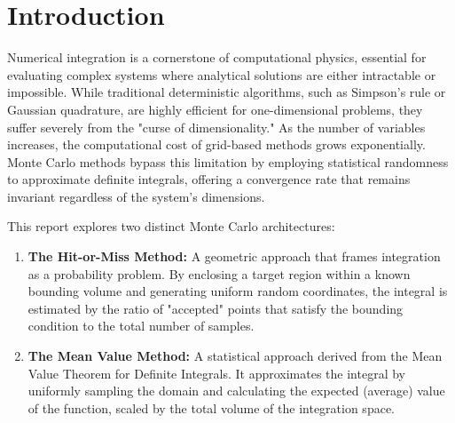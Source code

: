 \documentclass[12pt, a4paper, twoside]{article}
\begin{document}
    \begin{abstract}
        This report investigates the application and statistical validity of Monte Carlo computational methods for solving deterministic integration problems. By utilizing pseudorandom number generation, both the Hit-or-Miss (rejection) method and the Mean Value (sample average) method are implemented to evaluate integrals across single and multiple dimensions. The study spans fundamental geometric estimations, such as the computation of $\pi$, to complex multi-dimensional surface volumes bounded by non-linear constraints, including a paraboloid over a circular domain. A central focus is placed on the rigorous empirical verification of the algorithm's statistical error. Through logarithmic curve fitting of the absolute error against the number of iterations ($N$), the results successfully demonstrate that the integration error strictly adheres to the $O(N^{-0.5})$ convergence rate dictated by the Central Limit Theorem, completely independent of the integral's dimensionality.
    \end{abstract}
    
    \thispagestyle{empty}
    \newpage

  	\tableofcontents
	\thispagestyle{empty}
	
	\clearpage

    \section{Introduction}

       Numerical integration is a cornerstone of computational physics, essential for evaluating complex systems where analytical solutions are either intractable or impossible. While traditional deterministic algorithms, such as Simpson's rule or Gaussian quadrature, are highly efficient for one-dimensional problems, they suffer severely from the "curse of dimensionality." As the number of variables increases, the computational cost of grid-based methods grows exponentially. Monte Carlo methods bypass this limitation by employing statistical randomness to approximate definite integrals, offering a convergence rate that remains invariant regardless of the system's dimensions.
       
       This report explores two distinct Monte Carlo architectures:
       \begin{enumerate}
        \item {\bf The Hit-or-Miss Method:} A geometric approach that frames integration as a probability problem. By enclosing a target region within a known bounding volume and generating uniform random coordinates, the integral is estimated by the ratio of "accepted" points that satisfy the bounding condition to the total number of samples.
        \item  {\bf The Mean Value Method:} A statistical approach derived from the Mean Value Theorem for Definite Integrals. It approximates the integral by uniformly sampling the domain and calculating the expected (average) value of the function, scaled by the total volume of the integration space.
       \end{enumerate}
       
\end{document}
